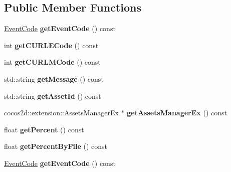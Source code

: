 \subsection*{Public Member Functions}
\begin{DoxyCompactItemize}
\item 
\mbox{\label{classEventAssetsManagerEx_a6fd124bc56963a15fc194925d2b7b6d7}} 
\hyperlink{classEventAssetsManagerEx_ae48992cd906169f84a146e7ae8851cae}{Event\+Code} {\bfseries get\+Event\+Code} () const
\item 
\mbox{\label{classEventAssetsManagerEx_ab184fe2408824ff6d2e16532718df889}} 
int {\bfseries get\+C\+U\+R\+L\+E\+Code} () const
\item 
\mbox{\label{classEventAssetsManagerEx_a9c181d66c5f5214f1f274096d64c5a6e}} 
int {\bfseries get\+C\+U\+R\+L\+M\+Code} () const
\item 
\mbox{\label{classEventAssetsManagerEx_ad9742b1cdb51d66e5feafe002594a066}} 
std\+::string {\bfseries get\+Message} () const
\item 
\mbox{\label{classEventAssetsManagerEx_a7d9e014e90e71a8ab373295241148fec}} 
std\+::string {\bfseries get\+Asset\+Id} () const
\item 
\mbox{\label{classEventAssetsManagerEx_a3543c086aebfeb351deac30147035b63}} 
cocos2d\+::extension\+::\+Assets\+Manager\+Ex $\ast$ {\bfseries get\+Assets\+Manager\+Ex} () const
\item 
\mbox{\label{classEventAssetsManagerEx_a16c07316d5e4ffe4ea28a91394cd8d82}} 
float {\bfseries get\+Percent} () const
\item 
\mbox{\label{classEventAssetsManagerEx_a1c790296467dc25b3a15c9ba8ccbccc6}} 
float {\bfseries get\+Percent\+By\+File} () const
\item 
\mbox{\label{classEventAssetsManagerEx_a6fd124bc56963a15fc194925d2b7b6d7}} 
\hyperlink{classEventAssetsManagerEx_ae48992cd906169f84a146e7ae8851cae}{Event\+Code} {\bfseries get\+Event\+Code} () const

\end{DoxyCompactItemize}
